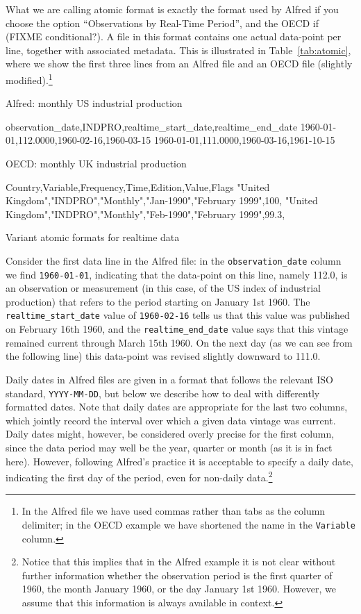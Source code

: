 What we are calling atomic format is exactly the format used by Alfred
if you choose the option ``Observations by Real-Time Period'', and the
OECD if (FIXME conditional?). A file in this format contains one
actual data-point per line, together with associated metadata. This is
illustrated in Table~\ref{tab:atomic}, where we show the first three
lines from an Alfred file and an OECD file (slightly
modified).\footnote{In the Alfred file we have used commas rather than
  tabs as the column delimiter; in the OECD example we have shortened
  the name in the \texttt{Variable} column.}

\begin{table}[htbp]
\begin{center}
Alfred: monthly US industrial production
\begin{code}
observation_date,INDPRO,realtime_start_date,realtime_end_date
1960-01-01,112.0000,1960-02-16,1960-03-15
1960-01-01,111.0000,1960-03-16,1961-10-15
\end{code}
OECD: monthly UK industrial production
\begin{code}
Country,Variable,Frequency,Time,Edition,Value,Flags
"United Kingdom","INDPRO","Monthly","Jan-1990","February 1999",100,
"United Kingdom","INDPRO","Monthly","Feb-1990","February 1999",99.3,
\end{code}
\end{center}
\caption{Variant atomic formats for realtime data}
\label{tab:atomic}
\end{table}

Consider the first data line in the Alfred file: in the
\verb|observation_date| column we find \texttt{1960-01-01}, indicating
that the data-point on this line, namely 112.0, is an observation or
measurement (in this case, of the US index of industrial production)
that refers to the period starting on January 1st 1960. The
\verb|realtime_start_date| value of \texttt{1960-02-16} tells us that
this value was published on February 16th 1960, and the
\verb|realtime_end_date| value says that this vintage remained current
through March 15th 1960. On the next day (as we can see from the
following line) this data-point was revised slightly downward to
111.0.

Daily dates in Alfred files are given in a format that follows the
relevant ISO standard, \texttt{YYYY-MM-DD}, but below we describe how
to deal with differently formatted dates. Note that daily dates are
appropriate for the last two columns, which jointly record the
interval over which a given data vintage was current. Daily dates
might, however, be considered overly precise for the first column,
since the data period may well be the year, quarter or month (as it is
in fact here). However, following Alfred's practice it is acceptable
to specify a daily date, indicating the first day of the period, even
for non-daily data.\footnote{Notice that this implies that in the
  Alfred example it is not clear without further information whether
  the observation period is the first quarter of 1960, the month
  January 1960, or the day January 1st 1960.  However, we assume that
  this information is always available in context.}

